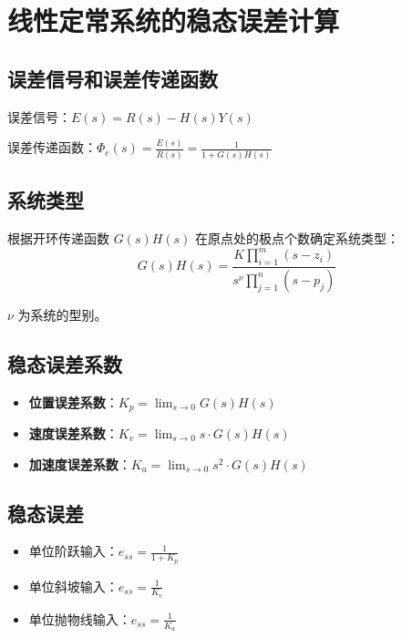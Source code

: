 \section{线性定常系统的稳态误差计算}

\subsection{误差信号和误差传递函数}
误差信号：$E(s) = R(s) - H(s)Y(s)$

误差传递函数：$\Phi_e(s) = \frac{E(s)}{R(s)} = \frac{1}{1 + G(s)H(s)}$

\subsection{系统类型}
根据开环传递函数 $G(s)H(s)$ 在原点处的极点个数确定系统类型：
\[G(s)H(s) = \frac{K \prod_{i=1}^{m}(s - z_i)}{s^\nu \prod_{j=1}^{n}(s - p_j)}\]

$\nu$ 为系统的型别。

\subsection{稳态误差系数}
\begin{itemize}
    \item \textbf{位置误差系数}：$K_p = \lim_{s \to 0} G(s)H(s)$
    \item \textbf{速度误差系数}：$K_v = \lim_{s \to 0} s \cdot G(s)H(s)$
    \item \textbf{加速度误差系数}：$K_a = \lim_{s \to 0} s^2 \cdot G(s)H(s)$
\end{itemize}

\subsection{稳态误差}
\begin{itemize}
    \item 单位阶跃输入：$e_{ss} = \frac{1}{1 + K_p}$
    \item 单位斜坡输入：$e_{ss} = \frac{1}{K_v}$
    \item 单位抛物线输入：$e_{ss} = \frac{1}{K_a}$
\end{itemize}
